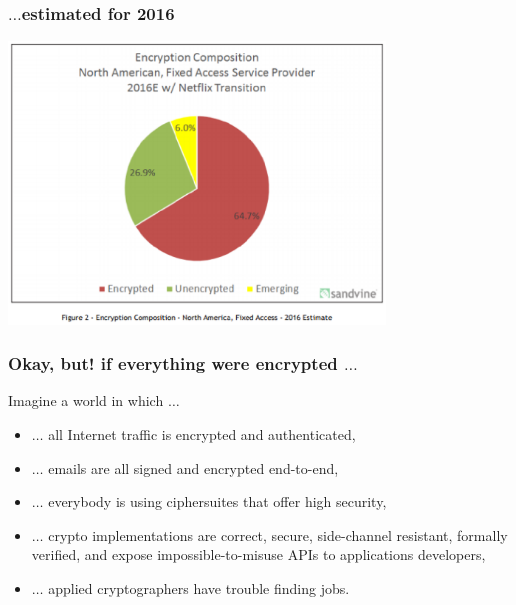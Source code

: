 \begin{frame}
  \frametitle{$\dots$estimated for 2016}
  \begin{center}
    \includegraphics[width=10cm]{webencrypt2016}
  \end{center}
\end{frame}


\begin{frame}
  \frametitle{Okay, but! if everything were encrypted $\dots$}

  \begin{block}{Imagine a world in which $\dots$}
  \begin{itemize}
    \item $\dots$ all Internet traffic is encrypted and authenticated,
    \item<2-> $\dots$ emails are all signed and encrypted end-to-end,
    \item<3-> $\dots$ everybody is using ciphersuites that offer high security,
    \item<5-> $\dots$ crypto implementations are correct, secure, side-channel
      resistant, formally verified, and expose impossible-to-misuse APIs to
      applications developers,
    \item<6-> $\dots$ applied cryptographers have trouble finding jobs.
  \end{itemize}
  \end{block}

\end{frame}



